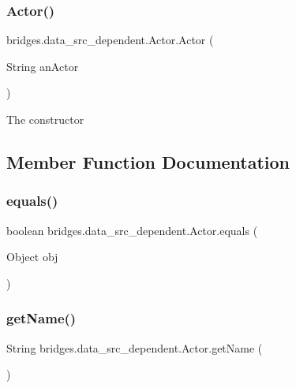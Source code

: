 \subsubsection{\texorpdfstring{Actor()}{Actor()}}
{\footnotesize\ttfamily bridges.\+data\+\_\+src\+\_\+dependent.\+Actor.\+Actor (\begin{DoxyParamCaption}\item[{String}]{an\+Actor }\end{DoxyParamCaption})}

The constructor 

\subsection{Member Function Documentation}
\hypertarget{classbridges_1_1data__src__dependent_1_1_actor_a54aeeaad51e062a6fdbfd8d06d486e56}{}\label{classbridges_1_1data__src__dependent_1_1_actor_a54aeeaad51e062a6fdbfd8d06d486e56} 
\subsubsection{\texorpdfstring{equals()}{equals()}}
{\footnotesize\ttfamily boolean bridges.\+data\+\_\+src\+\_\+dependent.\+Actor.\+equals (\begin{DoxyParamCaption}\item[{Object}]{obj }\end{DoxyParamCaption})}

\hypertarget{classbridges_1_1data__src__dependent_1_1_actor_afb8bf68eb6f0daa3818dc6045371f6e6}{}\label{classbridges_1_1data__src__dependent_1_1_actor_afb8bf68eb6f0daa3818dc6045371f6e6} 
\subsubsection{\texorpdfstring{get\+Name()}{getName()}}
{\footnotesize\ttfamily String bridges.\+data\+\_\+src\+\_\+dependent.\+Actor.\+get\+Name (\begin{DoxyParamCaption}{ }\end{DoxyParamCaption})}

